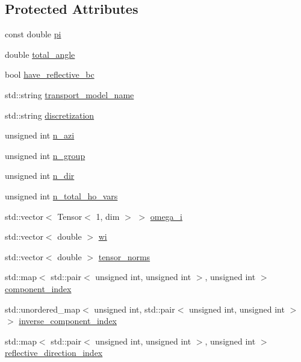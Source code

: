 \subsection*{Protected Attributes}
\begin{DoxyCompactItemize}
\item 
const double \hyperlink{class_a_q_base_a002ce18f617db787616e60fba67899a9}{pi}
\item 
double \hyperlink{class_a_q_base_a930e1dbffe2c99f42b76ea3164905ac1}{total\+\_\+angle}
\item 
bool \hyperlink{class_a_q_base_a8afa1e0da5bbb4846e495178e165b5b5}{have\+\_\+reflective\+\_\+bc}
\item 
std\+::string \hyperlink{class_a_q_base_a14d94b7179306f35228b90fd5f42c65a}{transport\+\_\+model\+\_\+name}
\item 
std\+::string \hyperlink{class_a_q_base_a6c454af11008e235340a7b8e31a02114}{discretization}
\item 
unsigned int \hyperlink{class_a_q_base_aaff6bd848436445d267c1a121a93e4ea}{n\+\_\+azi}
\item 
unsigned int \hyperlink{class_a_q_base_a07b0839db1844f879f3d9c7d7014fb7f}{n\+\_\+group}
\item 
unsigned int \hyperlink{class_a_q_base_a93b0c70dd1d3ec401601ceaca88723b1}{n\+\_\+dir}
\item 
unsigned int \hyperlink{class_a_q_base_a7169f8e3b53059317bb2144519f64be9}{n\+\_\+total\+\_\+ho\+\_\+vars}
\item 
std\+::vector$<$ Tensor$<$ 1, dim $>$ $>$ \hyperlink{class_a_q_base_a07aaf517b03be3f8405fd4063cf59231}{omega\+\_\+i}
\item 
std\+::vector$<$ double $>$ \hyperlink{class_a_q_base_aa43b0232837b86e608da7507bd9a14b5}{wi}
\item 
std\+::vector$<$ double $>$ \hyperlink{class_a_q_base_a89db12cbc1a0a01420897480ab8678e8}{tensor\+\_\+norms}
\item 
std\+::map$<$ std\+::pair$<$ unsigned int, unsigned int $>$, unsigned int $>$ \hyperlink{class_a_q_base_a0d9e9c6302e481718d62d76c09c83d2d}{component\+\_\+index}
\item 
std\+::unordered\+\_\+map$<$ unsigned int, std\+::pair$<$ unsigned int, unsigned int $>$ $>$ \hyperlink{class_a_q_base_a657640cc73cef6130bdf5b325dd0fd11}{inverse\+\_\+component\+\_\+index}
\item 
std\+::map$<$ std\+::pair$<$ unsigned int, unsigned int $>$, unsigned int $>$ \hyperlink{class_a_q_base_a9aa6c274dd0ef167528bbec76637cc22}{reflective\+\_\+direction\+\_\+index}
\end{DoxyCompactItemize}
